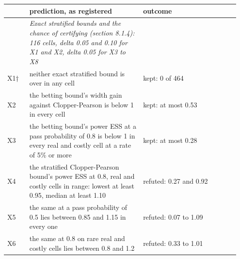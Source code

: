 \documentclass[11pt]{article}
\begin{document}
\begingroup\footnotesize\setlength{\tabcolsep}{4pt}
\begin{longtable}{@{}>{\raggedright\arraybackslash}p{0.093\linewidth}>{\raggedright\arraybackslash}p{0.461\linewidth}>{\raggedright\arraybackslash}p{0.392\linewidth}@{}}
\toprule
 & \textbf{\hspace{0pt}prediction, as registered} & \textbf{\hspace{0pt}outcome} \\
\midrule
\endhead
\bottomrule
\endlastfoot
 & \hspace{0pt}\emph{Exact stratified bounds and the chance of certifying (section 8.1.4): 116 cells, delta 0.05 and 0.10 for X1 and X2, delta 0.05 for X3 to X8} &  \\
\hspace{0pt}X1† & \hspace{0pt}neither exact stratified bound is over in any cell & \hspace{0pt}kept: 0 of 464 \\
\hspace{0pt}X2 & \hspace{0pt}the betting bound's width gain against Clopper-Pearson is below 1 in every cell & \hspace{0pt}kept: at most 0.53 \\
\hspace{0pt}X3 & \hspace{0pt}the betting bound's power ESS at a pass probability of 0.8 is below 1 in every real and costly cell at a rate of 5\% or more & \hspace{0pt}kept: at most 0.28 \\
\hspace{0pt}X4 & \hspace{0pt}the stratified Clopper-Pearson bound's power ESS at 0.8, real and costly cells in range: lowest at least 0.95, median at least 1.10 & \hspace{0pt}refuted: 0.27 and 0.92 \\
\hspace{0pt}X5 & \hspace{0pt}the same at a pass probability of 0.5 lies between 0.85 and 1.15 in every one & \hspace{0pt}refuted: 0.07 to 1.09 \\
\hspace{0pt}X6 & \hspace{0pt}the same at 0.8 on rare real and costly cells lies between 0.8 and 1.2 & \hspace{0pt}refuted: 0.33 to 1.01 \\

\end{longtable}
\end{document}
